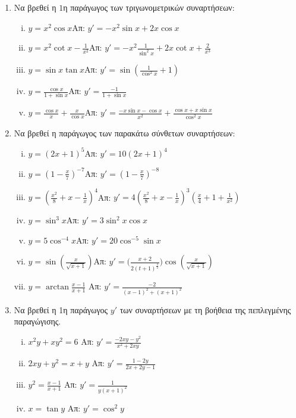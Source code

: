 \begin{enumerate}
\item Να βρεθεί η $1$η παράγωγος των τριγωνομετρικών συναρτήσεων:

\begin{enumerate}[i)]
\item $y=x^2\cos x$\hfill Απ: $y'=-x^2\sin x+2x\cos x$
\item $y=x^2\cot x -\frac{1}{x^2}$\hfill Απ: $y'=-x^2\frac{1}{\sin^2 x}+2x\cot x+\frac{2}{x^3}$
\item $y=\sin x \tan x$\hfill Απ: $y'=\sin\left(\frac{1}{\cos^2{x}}+1\right)$
\item $y=\frac{\cos x}{1+\sin x}$\hfill Απ: $y'=\frac{-1}{1+\sin x}$
\item $y = \frac{\cos x}{x}+\frac{x}{\cos x}$\hfill Απ: $y'=\frac{-x\sin x-\cos x}{x^2}+\frac{\cos x+x\sin x}{\cos^2 x}$
\end{enumerate}

\pagebreak

\item Να βρεθεί η παράγωγος των παρακάτω σύνθετων συναρτήσεων:

\begin{enumerate}[i)]
\item $y=(2x+1)^5$\hfill Απ: $y'=10(2x+1)^4$
\item $y=\left(1-\frac{x}{7}\right)^{-7}$\hfill Απ: $y'=\left(1-\frac{x}{7}\right)^{-8}$
\item $y=\left(\frac{x^2}{8}+x-\frac{1}{x}\right)^4$\hfill Απ: $y'=4\left(\frac{x^2}{8}+x-\frac{1}{x}\right)^3\left(\frac{x}{4}+1+\frac{1}{x^2}\right)$
\item $y=\sin^3 x$\hfill Απ: $y'=3\sin^2x \cos x$
\item $y=5\cos^{-4}x$\hfill Απ: $y'=20\cos^{-5}\sin x$
\item $y=\sin\left(\frac{x}{\sqrt{x+1}}\right)$\hfill Απ: $y'=\biggl(\frac{x+2}{2(t+1)^{\frac{3}{2}}}\biggr)\cos\left(\frac{x}{\sqrt{x+1}}\right)$
\item $ y = \arctan{\frac{x-1}{x+1}}  $ \hfill Απ: $ y' = \frac{-2}{(x-1)^{2} + (x+1)^{2}} $
\end{enumerate}

\item Να βρεθεί η 1η παράγωγος $ y' $ των συναρτήσεων με τη βοήθεια της πεπλεγμένης
	παραγώγισης.

	\begin{enumerate}[i)]
		\item $  x^{2}y + xy^{2} = 6 $ \hfill Απ: $ y'  = \frac{-2xy - y^{2}}{x^{2} + 2xy}
			$
		\item $  2xy + y^{2} = x+y $ \hfill Απ: $ y' =  \frac{1-2y}{2x+2y-1} $
		\item $ y^{2} = \frac{x-1}{x+1} $ \hfill Απ: $ y' =  \frac{1}{y(x+1)^{2}} $
		\item $  x = \tan y $ \hfill Απ: $ y'  = \cos^{2}{y} $
	\end{enumerate}


\end{enumerate}
